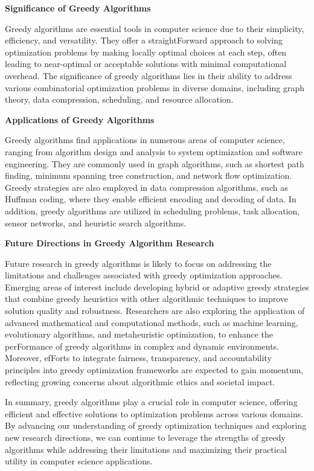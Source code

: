 \documentclass[12pt]{book} %
\begin{document}
\textbf{Significance of Greedy Algorithms}

Greedy algorithms are essential tools in computer science due to their simplicity, efficiency, and versatility. They offer a straightForward approach to solving optimization problems by making locally optimal choices at each step, often leading to near-optimal or acceptable solutions with minimal computational overhead. The significance of greedy algorithms lies in their ability to address various combinatorial optimization problems in diverse domains, including graph theory, data compression, scheduling, and resource allocation.

\textbf{Applications of Greedy Algorithms}

Greedy algorithms find applications in numerous areas of computer science, ranging from algorithm design and analysis to system optimization and software engineering. They are commonly used in graph algorithms, such as shortest path finding, minimum spanning tree construction, and network flow optimization. Greedy strategies are also employed in data compression algorithms, such as Huffman coding, where they enable efficient encoding and decoding of data. In addition, greedy algorithms are utilized in scheduling problems, task allocation, sensor networks, and heuristic search algorithms.


\textbf{Future Directions in Greedy Algorithm Research}

Future research in greedy algorithms is likely to focus on addressing the limitations and challenges associated with greedy optimization approaches. Emerging areas of interest include developing hybrid or adaptive greedy strategies that combine greedy heuristics with other algorithmic techniques to improve solution quality and robustness. Researchers are also exploring the application of advanced mathematical and computational methods, such as machine learning, evolutionary algorithms, and metaheuristic optimization, to enhance the perFormance of greedy algorithms in complex and dynamic environments. Moreover, efForts to integrate fairness, transparency, and accountability principles into greedy optimization frameworks are expected to gain momentum, reflecting growing concerns about algorithmic ethics and societal impact.

In summary, greedy algorithms play a crucial role in computer science, offering efficient and effective solutions to optimization problems across various domains. By advancing our understanding of greedy optimization techniques and exploring new research directions, we can continue to leverage the strengths of greedy algorithms while addressing their limitations and maximizing their practical utility in computer science applications.
\end{document}
